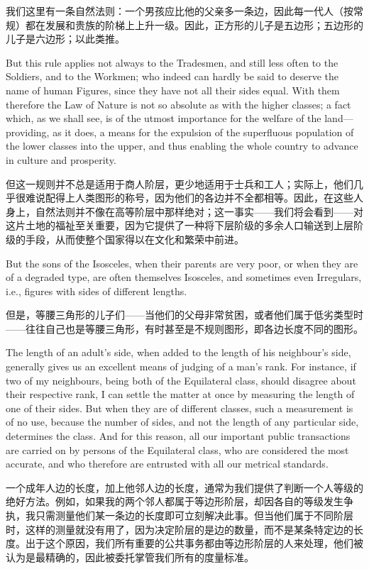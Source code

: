 \documentclass[12pt,UTF8]{ctexbook}
\begin{document}
我们这里有一条自然法则：一个男孩应比他的父亲多一条边，因此每一代人（按常规）都在发展和贵族的阶梯上上升一级。因此，正方形的儿子是五边形；五边形的儿子是六边形；以此类推。

But this rule applies not always to the Tradesmen, and still less often to the Soldiers, and to the Workmen; who indeed can hardly be said to deserve the name of human Figures, since they have not all their sides equal. With them therefore the Law of Nature is not so absolute as with the higher classes; a fact which, as we shall see, is of the utmost importance for the welfare of the land---providing, as it does, a means for the expulsion of the superfluous population of the lower classes into the upper, and thus enabling the whole country to advance in culture and prosperity.

但这一规则并不总是适用于商人阶层，更少地适用于士兵和工人；实际上，他们几乎很难说配得上人类图形的称号，因为他们的各边并不全都相等。因此，在这些人身上，自然法则并不像在高等阶层中那样绝对；这一事实——我们将会看到——对这片土地的福祉至关重要，因为它提供了一种将下层阶级的多余人口输送到上层阶级的手段，从而使整个国家得以在文化和繁荣中前进。

But the sons of the Isosceles, when their parents are very poor, or when they are of a degraded type, are often themselves Isosceles, and sometimes even Irregulars, i.e., figures with sides of different lengths.

但是，等腰三角形的儿子们——当他们的父母非常贫困，或者他们属于低劣类型时——往往自己也是等腰三角形，有时甚至是不规则图形，即各边长度不同的图形。

The length of an adult's side, when added to the length of his neighbour's side, generally gives us an excellent means of judging of a man's rank. For instance, if two of my neighbours, being both of the Equilateral class, should disagree about their respective rank, I can settle the matter at once by measuring the length of one of their sides. But when they are of different classes, such a measurement is of no use, because the number of sides, and not the length of any particular side, determines the class. And for this reason, all our important public transactions are carried on by persons of the Equilateral class, who are considered the most accurate, and who therefore are entrusted with all our metrical standards.

一个成年人边的长度，加上他邻人边的长度，通常为我们提供了判断一个人等级的绝好方法。例如，如果我的两个邻人都属于等边形阶层，却因各自的等级发生争执，我只需测量他们某一条边的长度即可立刻解决此事。但当他们属于不同阶层时，这样的测量就没有用了，因为决定阶层的是边的数量，而不是某条特定边的长度。出于这个原因，我们所有重要的公共事务都由等边形阶层的人来处理，他们被认为是最精确的，因此被委托掌管我们所有的度量标准。
\end{document}
